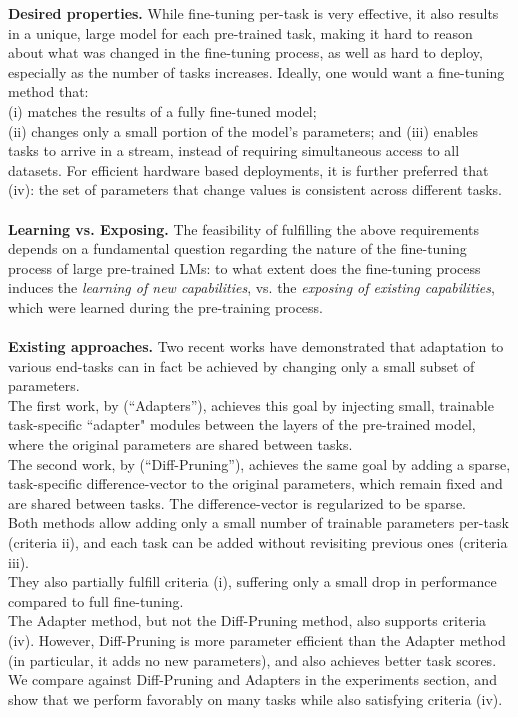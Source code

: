 \textbf{Desired properties.} While fine-tuning per-task is very effective, it also results in a unique, large model for each pre-trained task, making it hard to reason about what was changed in the fine-tuning process, as well as hard to deploy, especially as the number of tasks increases. Ideally, one would want a fine-tuning method that:\\
(i) matches the results of a fully fine-tuned model;\\
(ii) changes only a small portion of the model's parameters; and (iii) enables tasks to arrive in a stream, instead of requiring simultaneous access to all datasets. For efficient hardware based deployments, it is further preferred that (iv): the set of parameters that change values is consistent across different tasks.\\\\
\textbf{Learning vs. Exposing.} The feasibility of fulfilling the above requirements depends on a fundamental question regarding the nature of the fine-tuning process of large pre-trained LMs: to what extent does the fine-tuning process induces the \emph{learning of new capabilities}, vs. the \emph{exposing of existing capabilities}, which were learned during the pre-training process.\\\\
\textbf{Existing approaches.} Two recent works have demonstrated that adaptation to various end-tasks can in fact be achieved by changing only a small subset of parameters.\\
The first work, by \citet{DBLP:journals/corr/abs-1902-00751} (``Adapters''), achieves this goal by injecting small, trainable task-specific ``adapter" modules between the layers of the pre-trained model, where the original parameters are shared between tasks.\\
The second work, by \citet{diffp} (``Diff-Pruning''), achieves the same goal by adding a sparse, task-specific difference-vector to the original parameters, which remain fixed and are shared between tasks. The difference-vector is regularized to be sparse.\\
Both methods allow adding only a small number of trainable parameters per-task (criteria ii), and each task can be added without revisiting previous ones (criteria iii).\\
They also partially fulfill criteria (i), suffering only a small drop in performance compared to full fine-tuning.\\
The Adapter method, but not the Diff-Pruning method, also supports criteria (iv). However, Diff-Pruning is more parameter efficient than the Adapter method (in particular, it adds no new parameters), and also achieves better task scores.\\
We compare against Diff-Pruning and Adapters in the experiments section, and show that we perform favorably on many tasks while also satisfying criteria (iv).

